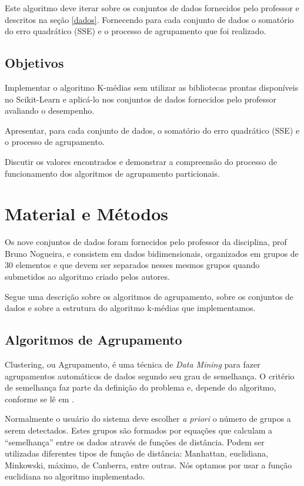 \documentclass[12pt, a4paper]{article}
\begin{document}
Este algoritmo deve iterar sobre os conjuntos de dados fornecidos pelo professor e descritos na seção \ref{dados}. Fornecendo para cada conjunto de dados o somatório do erro quadrático (SSE) e o processo de agrupamento que foi realizado.

\subsection{Objetivos}
Implementar o algoritmo K-médias sem utilizar as bibliotecas prontas disponíveis no Scikit-Learn \citep{scikit-learn} e aplicá-lo nos conjuntos de dados fornecidos pelo professor avaliando o desempenho.

Apresentar, para cada conjunto de dados, o somatório do erro quadrático (SSE) e o processo de agrupamento.

Discutir os valores encontrados e demonstrar a compreensão do processo de funcionamento dos algoritmos de agrupamento particionais.

\section{Material e Métodos}
Os nove conjuntos de dados foram fornecidos pelo professor da disciplina, prof Bruno Nogueira, e consistem em dados bidimensionais, organizados em grupos de 30 elementos e que devem ser separados nesses mesmos grupos quando submetidos ao algoritmo criado pelos autores.

Segue uma descrição sobre os algoritmos de agrupamento, sobre os conjuntos de dados e sobre a estrutura do algoritmo k-médias que implementamos.

\subsection{Algoritmos de Agrupamento}
\label{algoritmos}
Clustering, ou Agrupamento,  é uma técnica de \textit{Data Mining} para fazer agrupamentos automáticos de dados segundo seu grau de semelhança. O critério de semelhança faz parte da definição do problema e, depende do algoritmo, conforme se lê em \citep{clustering}.

Normalmente o usuário do sistema deve escolher \textit{a priori} o número de grupos a serem detectados. Estes grupos são formados por equações que calculam a ``semelhança'' entre os dados através de funções de distância. Podem ser utilizadas diferentes tipos de função de distância: Manhattan, euclidiana, Minkowski, máximo, de Canberra, entre outras. Nós optamos por usar a função euclidiana no algoritmo implementado.
\end{document}
